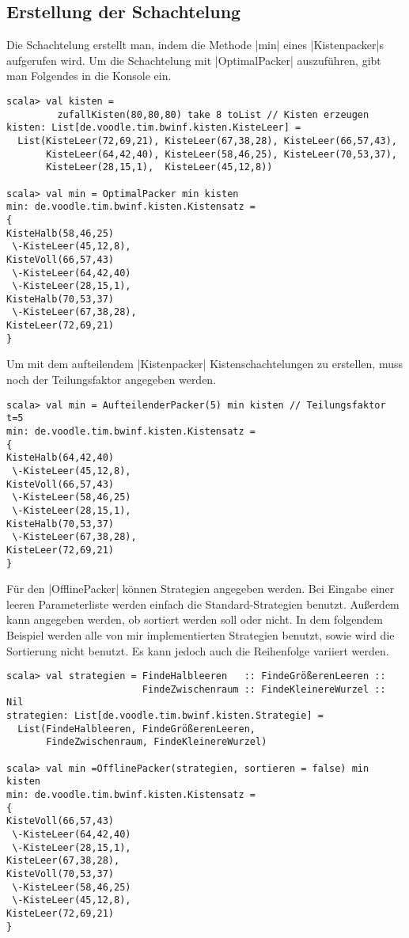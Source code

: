 \subsection{Erstellung der Schachtelung}
Die Schachtelung erstellt man, indem die Methode |min| eines |Kistenpacker|s aufgerufen wird.
Um die Schachtelung mit |OptimalPacker| auszuführen, gibt man Folgendes in die Konsole ein.
\label{demo_kisten}
\begin{lstlisting}
scala> val kisten =
         zufallKisten(80,80,80) take 8 toList // Kisten erzeugen
kisten: List[de.voodle.tim.bwinf.kisten.KisteLeer] =
  List(KisteLeer(72,69,21), KisteLeer(67,38,28), KisteLeer(66,57,43),
       KisteLeer(64,42,40), KisteLeer(58,46,25), KisteLeer(70,53,37),
       KisteLeer(28,15,1),  KisteLeer(45,12,8))

scala> val min = OptimalPacker min kisten
min: de.voodle.tim.bwinf.kisten.Kistensatz = 
{
KisteHalb(58,46,25)
 \-KisteLeer(45,12,8),
KisteVoll(66,57,43)
 \-KisteLeer(64,42,40)
 \-KisteLeer(28,15,1),
KisteHalb(70,53,37)
 \-KisteLeer(67,38,28),
KisteLeer(72,69,21)
}
\end{lstlisting}
Um mit dem aufteilendem |Kistenpacker| Kistenschachtelungen zu erstellen, muss noch der Teilungsfaktor angegeben werden.
\begin{lstlisting}
scala> val min = AufteilenderPacker(5) min kisten // Teilungsfaktor t=5
min: de.voodle.tim.bwinf.kisten.Kistensatz = 
{
KisteHalb(64,42,40)
 \-KisteLeer(45,12,8),
KisteVoll(66,57,43)
 \-KisteLeer(58,46,25)
 \-KisteLeer(28,15,1),
KisteHalb(70,53,37)
 \-KisteLeer(67,38,28),
KisteLeer(72,69,21)
}
\end{lstlisting}
Für den |OfflinePacker| können Strategien angegeben werden. Bei Eingabe einer leeren Parameterliste werden einfach die Standard-Strategien benutzt.
Außerdem kann angegeben werden, ob sortiert werden soll oder nicht.
In dem folgendem Beispiel werden alle von mir implementierten Strategien benutzt, sowie wird die Sortierung nicht benutzt.
Es kann jedoch auch die Reihenfolge variiert werden.
\begin{lstlisting}
scala> val strategien = FindeHalbleeren   :: FindeGrößerenLeeren ::
                        FindeZwischenraum :: FindeKleinereWurzel :: Nil
strategien: List[de.voodle.tim.bwinf.kisten.Strategie] =
  List(FindeHalbleeren, FindeGrößerenLeeren,
       FindeZwischenraum, FindeKleinereWurzel)

scala> val min =OfflinePacker(strategien, sortieren = false) min kisten
min: de.voodle.tim.bwinf.kisten.Kistensatz = 
{
KisteVoll(66,57,43)
 \-KisteLeer(64,42,40)
 \-KisteLeer(28,15,1),
KisteLeer(67,38,28),
KisteVoll(70,53,37)
 \-KisteLeer(58,46,25)
 \-KisteLeer(45,12,8),
KisteLeer(72,69,21)
}

\end{lstlisting}
